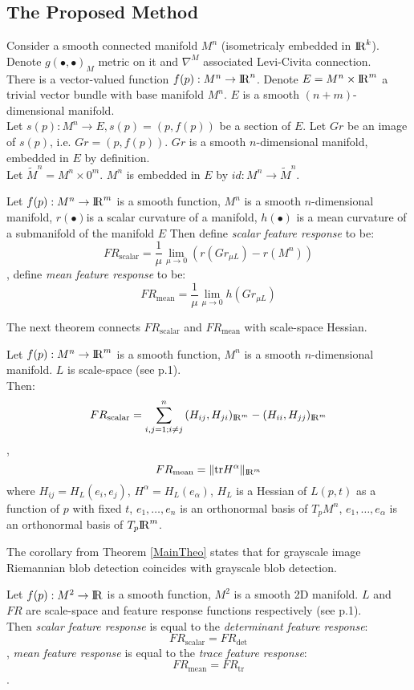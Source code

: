 \documentclass{llncs}
\newcommand{\toreal}{\rightarrow\bbbr}
\newcommand{\toeuclidean}[1]{\rightarrow\bbbr^{#1}}
\newcommand{\CovariantDiffManif}[1]{\nabla^{#1}}
\newcommand{\TangentSpaceP}[1]{{T_p}{#1}}
\newcommand{\FRScalar}{FR_{\mathrm{scalar}}}
\newcommand{\FRMean}{FR_{\mathrm{mean}}}
\newcommand {\tr}{\mathrm{tr}}
\begin{document}
\subsection{The Proposed Method}
Consider a smooth connected manifold $M^n$ (isometricaly embedded in ${\rm I\!R}^k$). Denote $g(∙,∙)_{M}$ metric on it and $\CovariantDiffManif{M}$ associated Levi-Civita connection. 
\\
There is a vector-valued function $f(p):M^n\toeuclidean{n}$. Denote $E=M^n\times {\rm I\!R}^m$ a  trivial vector bundle with base manifold $M^n$. $E$ is a smooth $(n+m)$-dimensional manifold. 
\\
Let $s(p):M^n\rightarrow E,s(p)=(p,f(p))$ be a section of $E$. Let $Gr$ be an image of $s(p)$, i.e. $Gr=(p,f(p))$. $Gr$ is a smooth $n$-dimensional manifold, embedded in $E$ by definition.
\\
Let $\tilde{M}^n=M^n\times 0^m$. $M^n$ is embedded in $E$ by $id:M^n\rightarrow\tilde{M}^n$.
\\
\begin{definition} \label{RiemanDef}
Let $f(p):M^n\toeuclidean{m}$ is a smooth function, $M^n$ is a smooth $n$-dimensional manifold, $r(∙)$is a scalar curvature of a manifold, $h(∙)$ is a mean curvature of a submanifold of the manifold $E$
Then define \emph{scalar feature response} to be:
$$\FRScalar=\frac{1}{\mu}\lim_{\mu\to 0} ( r(Gr_{\mu L} )-r(M^n ))$$,
define \emph{mean feature response} to be:
$$\FRMean=\frac{1}{\mu}\lim_{\mu\to 0} h(Gr_{\mu L})$$
\end{definition}
The next theorem connects $\FRScalar$ and $\FRMean$ with scale-space Hessian.
\begin{theorem} \label{MainTheo}
Let $f(p):M^n\toeuclidean{m}$ is a smooth function, $M^n$ is a smooth $n$-dimensional manifold. $L$ is scale-space (see p.1).\\
Then:
$$\FRScalar=\sum_{i,j=1; i\ne j}^{n}{(H_{ij},H_{ji})_{\bbbr^m}-(H_{ii},H_{jj})_{\bbbr^m}}$$,
$$\FRMean=\|\tr H^\alpha\|_{\bbbr^m}$$
where $H_{ij}=H_L (e_i,e_j)$, $H^\alpha=H_L (e_\alpha)$, $H_L$ is a Hessian of $L(p,t)$ as a function of $p$ with fixed $t$, 
$e_1,\dots,e_n$ is an orthonormal basis of $\TangentSpaceP{M^n}$, $e_1,\dots,e_\alpha$ is an orthonormal basis of $\TangentSpaceP{\bbbr^m}$.
\end{theorem}
The corollary from Theorem \ref{MainTheo} states that for grayscale image Riemannian blob detection coincides with grayscale blob detection.
\begin{corollary}\label{GrayscaleCol}
Let $f(p):M^2\toreal$ is a smooth function, $M^2$ is a smooth 2D manifold. $L$ and $FR$ are scale-space and feature response functions respectively (see p.1).\\
Then \emph{scalar feature response} is equal to the \emph{determinant feature response}:
$$\FRScalar=FR_{\det}$$,
\emph{mean feature response} is equal to the \emph{trace feature response}:
$$\FRMean=FR_{\mathrm{tr}}$$.
\end{corollary}
\end{document}
